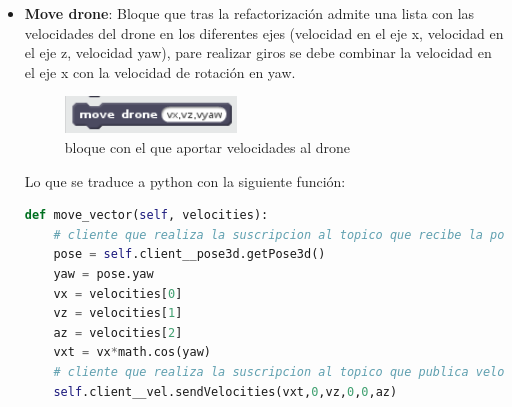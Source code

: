\begin{itemize}
\begin{itemize}
	\item \textbf{Move drone}: Bloque que tras la refactorización admite una lista con las velocidades del drone en los diferentes ejes (velocidad en el eje x, velocidad en el eje z, velocidad yaw), pare realizar giros se debe combinar la velocidad en el eje x con la velocidad de rotación en yaw.\\
	\begin{figure}[H]
     		\centering
     		\includegraphics[scale=1.2]{img/block-move-drone.png}
     		\caption{bloque con el que aportar velocidades al drone}
  		\label{fig:listas}
  	\end{figure}
  	
Lo que se traduce a python con la siguiente función:\\
  	
\begin{lstlisting}[language=python,firstnumber=1]
 def move_vector(self, velocities):
    # cliente que realiza la suscripcion al topico que recibe la pose
    pose = self.client__pose3d.getPose3d()
    yaw = pose.yaw
    vx = velocities[0]
    vz = velocities[1]
    az = velocities[2]
    vxt = vx*math.cos(yaw)
    # cliente que realiza la suscripcion al topico que publica velocidades
    self.client__vel.sendVelocities(vxt,0,vz,0,0,az)
\end{lstlisting}
	
	\end{itemize}
\end{itemize}



